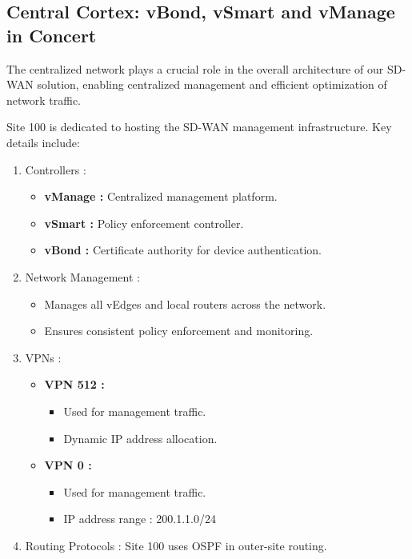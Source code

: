 \documentclass[12pt,english]{report}
\begin{document}

\clearpage %
\thispagestyle{fancy}
\subsection{Central Cortex: vBond, vSmart and vManage in Concert}
The centralized network plays a crucial role in the overall architecture of our SD-WAN solution, enabling centralized management and efficient optimization of network traffic. 

Site 100 is dedicated to hosting the SD-WAN management infrastructure. Key details include:
\begin{enumerate}
    \item Controllers :
        \begin{itemize}
        \item\textbf{vManage :} Centralized management platform.
        \item\textbf{vSmart :} Policy enforcement controller.
        \item\textbf{vBond :} Certificate authority for device authentication.
        \end{itemize}
    \item Network Management :
        \begin{itemize}
            \item Manages all vEdges and local routers across the network.
            \item Ensures consistent policy enforcement and monitoring.
        \end{itemize}
    \item VPNs :
        \begin{itemize}
            \item \textbf{VPN 512 :}
            \begin{itemize}
                \item Used for management traffic.
                \item Dynamic IP address allocation.
            \end{itemize}
            \item \textbf{VPN 0  :}
            \begin{itemize}
                \item Used for management traffic.
                \item IP address range : 200.1.1.0/24
            \end{itemize}
        \end{itemize}
    \item Routing Protocols :
        Site 100 uses OSPF in outer-site routing.
\end{enumerate}
\end{document}
